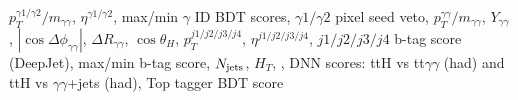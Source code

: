 $p_T^{\gamma 1/\gamma 2}/m_{\gamma\gamma}$, $\eta^{\gamma 1/\gamma 2}$, max/min $\gamma$ ID BDT scores, $\gamma 1/\gamma 2$ pixel seed veto, $p_T^{\gamma\gamma}/{m_{\gamma\gamma}}$, $Y_{\gamma\gamma}$, $|\cos{\Delta\phi_{\gamma\gamma}}|$, $\Delta R_{\gamma\gamma}$, $\cos{\theta_H}$, $p_T^{j1/j2/j3/j4}$, $\eta^{j1/j2/j3/j4}$, $j1/j2/j3/j4$ b-tag score (DeepJet), max/min b-tag score, $N_{\rm{jets}}$, $H_T$, \met, DNN scores: ttH vs tt$\gamma\gamma$ (had) and ttH vs $\gamma\gamma$+jets (had), Top tagger BDT score